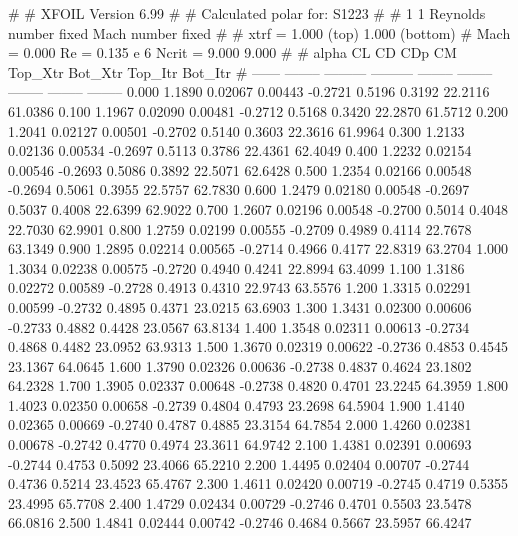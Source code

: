 #  
#       XFOIL         Version 6.99
#  
# Calculated polar for: S1223                                           
#  
# 1 1 Reynolds number fixed          Mach number fixed         
#  
# xtrf =   1.000 (top)        1.000 (bottom)  
# Mach =   0.000     Re =     0.135 e 6     Ncrit =   9.000  9.000
#  
#   alpha    CL        CD       CDp       CM     Top_Xtr  Bot_Xtr  Top_Itr  Bot_Itr
#  ------ -------- --------- --------- -------- -------- -------- -------- --------
   0.000   1.1890   0.02067   0.00443  -0.2721   0.5196   0.3192  22.2116  61.0386
   0.100   1.1967   0.02090   0.00481  -0.2712   0.5168   0.3420  22.2870  61.5712
   0.200   1.2041   0.02127   0.00501  -0.2702   0.5140   0.3603  22.3616  61.9964
   0.300   1.2133   0.02136   0.00534  -0.2697   0.5113   0.3786  22.4361  62.4049
   0.400   1.2232   0.02154   0.00546  -0.2693   0.5086   0.3892  22.5071  62.6428
   0.500   1.2354   0.02166   0.00548  -0.2694   0.5061   0.3955  22.5757  62.7830
   0.600   1.2479   0.02180   0.00548  -0.2697   0.5037   0.4008  22.6399  62.9022
   0.700   1.2607   0.02196   0.00548  -0.2700   0.5014   0.4048  22.7030  62.9901
   0.800   1.2759   0.02199   0.00555  -0.2709   0.4989   0.4114  22.7678  63.1349
   0.900   1.2895   0.02214   0.00565  -0.2714   0.4966   0.4177  22.8319  63.2704
   1.000   1.3034   0.02238   0.00575  -0.2720   0.4940   0.4241  22.8994  63.4099
   1.100   1.3186   0.02272   0.00589  -0.2728   0.4913   0.4310  22.9743  63.5576
   1.200   1.3315   0.02291   0.00599  -0.2732   0.4895   0.4371  23.0215  63.6903
   1.300   1.3431   0.02300   0.00606  -0.2733   0.4882   0.4428  23.0567  63.8134
   1.400   1.3548   0.02311   0.00613  -0.2734   0.4868   0.4482  23.0952  63.9313
   1.500   1.3670   0.02319   0.00622  -0.2736   0.4853   0.4545  23.1367  64.0645
   1.600   1.3790   0.02326   0.00636  -0.2738   0.4837   0.4624  23.1802  64.2328
   1.700   1.3905   0.02337   0.00648  -0.2738   0.4820   0.4701  23.2245  64.3959
   1.800   1.4023   0.02350   0.00658  -0.2739   0.4804   0.4793  23.2698  64.5904
   1.900   1.4140   0.02365   0.00669  -0.2740   0.4787   0.4885  23.3154  64.7854
   2.000   1.4260   0.02381   0.00678  -0.2742   0.4770   0.4974  23.3611  64.9742
   2.100   1.4381   0.02391   0.00693  -0.2744   0.4753   0.5092  23.4066  65.2210
   2.200   1.4495   0.02404   0.00707  -0.2744   0.4736   0.5214  23.4523  65.4767
   2.300   1.4611   0.02420   0.00719  -0.2745   0.4719   0.5355  23.4995  65.7708
   2.400   1.4729   0.02434   0.00729  -0.2746   0.4701   0.5503  23.5478  66.0816
   2.500   1.4841   0.02444   0.00742  -0.2746   0.4684   0.5667  23.5957  66.4247
